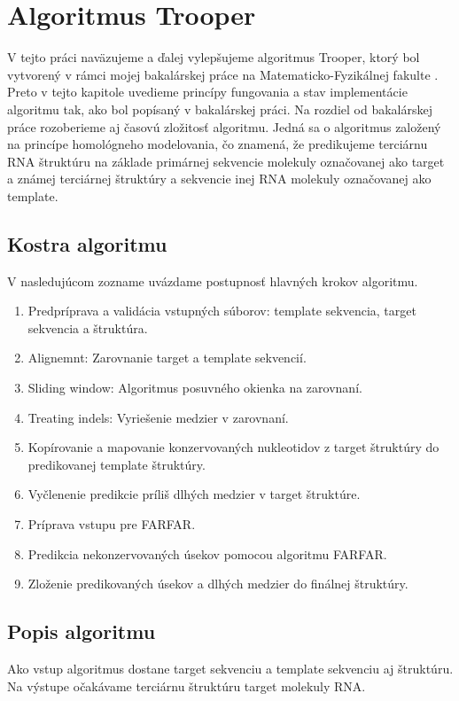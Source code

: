 \chapter{Algoritmus Trooper}

V tejto práci naväzujeme a ďalej vylepšujeme algoritmus Trooper, ktorý bol vytvorený v rámci mojej  bakalárskej práce na Matematicko-Fyzikálnej fakulte \cite{bc}. Preto v tejto kapitole uvedieme princípy fungovania a stav implementácie algoritmu tak, ako bol popísaný v bakalárskej práci. Na rozdiel od bakalárskej práce rozoberieme aj časovú zložitosť algoritmu.
Jedná sa o algoritmus založený na princípe homológneho modelovania, čo znamená, že predikujeme terciárnu RNA štruktúru na základe primárnej sekvencie molekuly označovanej ako target a známej terciárnej štruktúry a sekvencie inej RNA molekuly označovanej ako template. 


\section{Kostra algoritmu}

V nasledujúcom zozname uvázdame postupnosť hlavných krokov algoritmu.\label{3-kostra}
\begin{enumerate}
\item Predpríprava a validácia vstupných súborov: template sekvencia, target sekvencia a štruktúra.
\item Alignemnt: Zarovnanie target a template sekvencií.
\item Sliding window: Algoritmus posuvného okienka na zarovnaní.
\item Treating indels: Vyriešenie medzier v zarovnaní. \label{3-indels}
\item Kopírovanie a mapovanie konzervovaných nukleotidov z target štruktúry do predikovanej template štruktúry. \label{3-map}
\item Vyčlenenie predikcie príliš dlhých medzier v target štruktúre.\label{3-sphere}
\item Príprava vstupu pre FARFAR.
\item Predikcia nekonzervovaných úsekov pomocou algoritmu FARFAR.
\item Zloženie predikovaných úsekov a dlhých medzier do finálnej štruktúry.
\end{enumerate}

\section{Popis algoritmu}
Ako vstup algoritmus dostane target sekvenciu a template sekvenciu aj štruktúru. Na výstupe očakávame terciárnu štruktúru target molekuly RNA.


